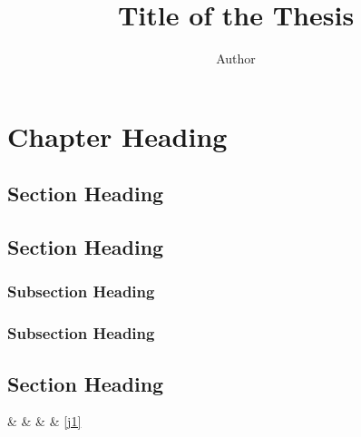 \documentclass[dissertation]{aaltoseries}
\author{Author}
\title{Title of the Thesis}
\begin{document}
\draftabstract{\lipsum[1-3]}
\draftabstract[finnish]{\lipsum[4-6]}
\draftabstract[swedish]{\lipsum[7-9]}

\begin{preface}
\lipsum[1-4]
\end{preface}

\tableofcontents

\listofpublications



\chapter{Chapter Heading}
\section{Section Heading}
\lipsum[1-4]
\section{Section Heading}
\lipsum[5-6]
\subsection{Subsection Heading}
\lipsum[7-8]
\subsection{Subsection Heading}
\lipsum[9-10]
\section{Section Heading}
\lipsum[11-12]


 \&  \&  \& \pageref{j1} \& \ref{j1}
\end{document}
